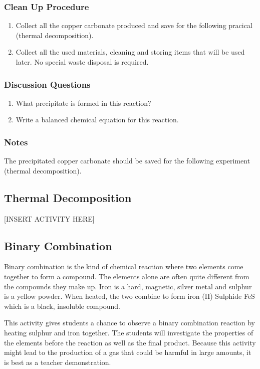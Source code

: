 \subsubsection*{Clean Up Procedure}
\begin{enumerate}
\item{Collect all the copper carbonate produced and save for the following pracical (thermal decomposition).}
\item{Collect all the used materials, cleaning and storing items that will be used later. No special waste disposal is required.}
\end{enumerate}

\subsubsection*{Discussion Questions}
\begin{enumerate}
\item{What precipitate is formed in this reaction?}
\item{Write a balanced chemical equation for this reaction.}
\end{enumerate}

\subsubsection*{Notes}
The precipitated copper carbonate should be saved for the following experiment (thermal decomposition).

\subsection{Thermal Decomposition}

[INSERT ACTIVITY HERE]

\subsection{Binary Combination}
Binary combination is the kind of chemical reaction where two elements come together to form a compound. The elements alone are often quite different from the compounds they make up. Iron is a hard, magnetic, silver metal and sulphur is a yellow powder. When heated, the two combine to form iron (II) Sulphide FeS which is a black, insoluble compound. 

This activity gives students a chance to observe a binary combination reaction by heating sulphur and iron together. The students will investigate the properties of the elements before the reaction as well as the final product. Because this activity might lead to the production of a gas that could be harmful in large amounts, it is best as a teacher demonstration.

